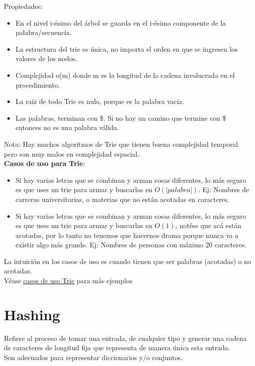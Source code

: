 \documentclass[10pt,a4paper]{article}
\begin{document}
Propiedades:
\begin{itemize}
    \item En el nivel i-ésimo del árbol se guarda en el i-ésimo componente de la palabra/secuencia.
    \item La estructura del trie es única, no importa el orden en que se ingresen los valores de los nodos.
    \item Complejidad o(m) donde m es la longitud de la cadena involucrada en el procedimiento.
    \item La raíz de todo Trie es nulo, porque es la palabra vacía.
    \item Las palabras, terminan con \$. Si no hay un camino que termine con \$ entonces no es una palabra válida. 
\end{itemize}
Nota: Hay muchos algoritmos de Trie que tienen buena complejidad temporal pero son muy malos en complejidad espacial. \\ 
\textbf{Casos de uso para Trie}:
\begin{itemize}
    \item Si hay varias letras que se combinan y arman cosas diferentes, lo más seguro es que uses un trie para armar y buscarlas en $O(|palabra|)$. Ej: Nombres de carreras universitarias, o materias que no están acotadas en caracteres.
    \item Si hay varias letras que se combinan y arman cosas diferentes, lo más seguro es que uses un trie para armar y buscarlas en $O(1)$, notése que acá están acotadas, por lo tanto no tenemos que hacernos drama porque nunca va a existir algo más grande. Ej: Nombres de personas con máximo 20 caracteres.
\end{itemize}
La intuición en los casos de uso es cuando tienen que ser palabras (acotadas) o no acotadas. \\
Véase \hyperref[subsec:operaciones_trie]{\underline{casos de uso Trie}} para más ejemplos \\
\section*{Hashing}
Refiere al proceso de tomar una entrada, de cualquier tipo y generar una cadena de caracteres de longitud fija que representa de manera única esta entrada. \\
Son adecuados para representar diccionarios y/o conjuntos. \\
\end{document}
